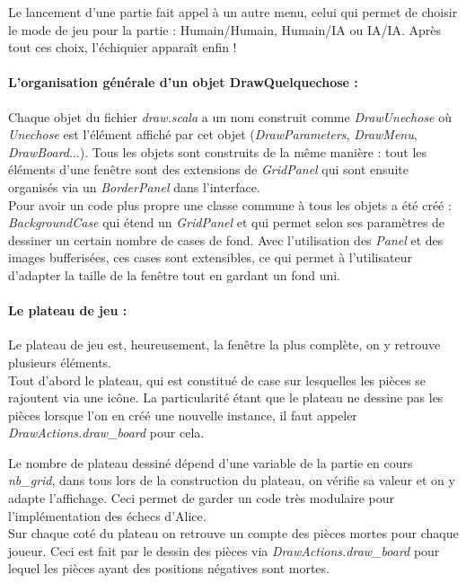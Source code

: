 \documentclass[a4paper]{article}
\begin{document}
Le lancement d'une partie fait appel à un autre menu, celui qui permet de choisir le mode de jeu pour la partie : Humain/Humain, Humain/IA ou IA/IA. Après tout ces choix, l'échiquier apparaît enfin !

\paragraph{L'organisation générale d'un objet DrawQuelquechose :}Chaque objet du fichier \textit{draw.scala} a un nom construit comme \textit{DrawUnechose} où \textit{Unechose} est l'élément affiché par cet objet (\textit{DrawParameters}, \textit{DrawMenu}, \textit{DrawBoard}...). Tous les objets sont construits de la même manière : tout les éléments d'une fenêtre sont des extensions de \textit{GridPanel} qui sont ensuite organisés via un \textit{BorderPanel} dans l'interface. \\

Pour avoir un code plus propre une classe commune à tous les objets a été créé : \textit{BackgroundCase} qui étend un \textit{GridPanel} et qui permet selon ses paramètres de dessiner un certain nombre de cases de fond. Avec l'utilisation des \textit{Panel} et des images bufferisées, ces cases sont extensibles, ce qui permet à l'utilisateur d'adapter la taille de la fenêtre tout en gardant un fond uni.

\paragraph{Le plateau de jeu :}Le plateau de jeu est, heureusement, la fenêtre la plus complète, on y retrouve plusieurs éléments. \\

Tout d'abord le plateau, qui est constitué de case sur lesquelles les pièces se rajoutent via une icône. La particularité étant que le plateau ne dessine pas les pièces lorsque l'on en créé une nouvelle instance, il faut appeler \textit{DrawActions.draw\_board} pour cela. 

Le nombre de plateau dessiné dépend d'une variable de la partie en cours \textit{nb\_grid}, dans tous lors de la construction du plateau, on vérifie sa valeur et on y adapte l'affichage. Ceci permet de garder un code très modulaire pour l'implémentation des échecs d'Alice. \\

Sur chaque coté du plateau on retrouve un compte des pièces mortes pour chaque joueur. Ceci est fait par le dessin des pièces via \textit{DrawActions.draw\_board} pour lequel les pièces ayant des positions négatives sont mortes.
\end{document}
